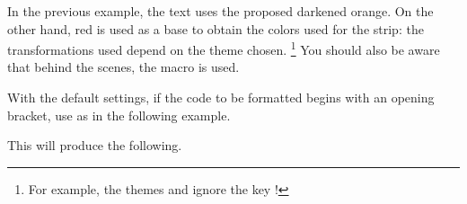 \documentclass{tutodoc}
\begin{document}
\begin{tdocnote}
    In the previous example, the text uses the proposed darkened orange. On the other hand, red is used as a base to obtain the colors used for the strip: the transformations used depend on the theme chosen.%
    \footnote{
        For example, the themes  and  ignore the key !
    }
    You should also be aware that behind the scenes, the macro  is used.

    \begin{tdoclatex}
    \end{tdoclatex}
\end{tdocnote}




\begin{tdocwarn}
    With the default settings, if the code to be formatted begins with an opening bracket, use  as in the following example.


    This will produce the following.
\end{tdocwarn}



\end{document}
